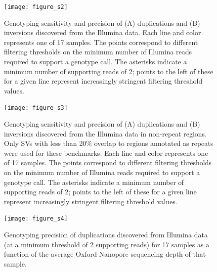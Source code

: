 \documentclass[12pt]{article}
\newenvironment{cfigure}
	{\begin{figure} \centering}
	{\end{figure}}
\begin{document}
\clearpage%

\begin{cfigure}
	\texttt{[image: figure\_s2]}
	
	\caption[Sensitivity and precision of Illumina duplication and inversion genotyping]{
		Genotyping sensitivity and precision of (A) duplications and (B) inversions discovered from the Illumina data.
		Each line and color represents one of 17 samples. 
		The points correspond to different filtering thresholds on the minimum number of Illumina reads required to support a genotype call.
		The asterisks indicate a minimum number of supporting reads of 2; points to the left of these for a given line represent increasingly stringent filtering threshold values.
	}

	\label{fig_s2}

\end{cfigure}

\clearpage%

\begin{cfigure}
	\texttt{[image: figure\_s3]}

	\caption[Sensitivity and precision of Illumina duplication and inversion genotyping in non-repeat regions]{
		Genotyping sensitivity and precision of (A) duplications and (B) inversions discovered from the Illumina data in non-repeat regions.
		Only SVs with less than 20\% overlap to regions annotated as repeats were used for these benchmarks. 
		Each line and color represents one of 17 samples. 
		The points correspond to different filtering thresholds on the minimum number of Illumina reads required to support a genotype call.
		The asterisks indicate a minimum number of supporting reads of 2; points to the left of these for a given line represent increasingly stringent filtering threshold values.
	}

	\label{fig_s3}

\end{cfigure}

\clearpage%

\begin{cfigure}
	\texttt{[image: figure\_s4]}

	\caption[Relationship between Oxford Nanopore sequencing depth and genotyping precision of Illumina duplications]{
		Genotyping precision of duplications discovered from Illumina data (at a minimum threshold of 2 supporting reads) for 17 samples as a function of the average Oxford Nanopore sequencing depth of that sample.
	}

	\label{fig_s4}

\end{cfigure}
\end{document}
